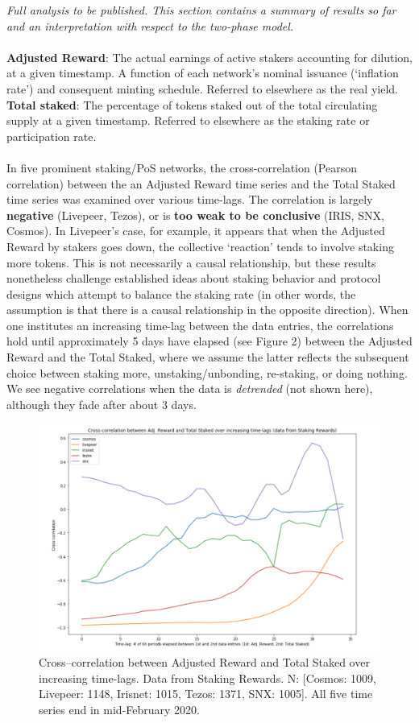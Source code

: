 \documentclass[8pt]{article}
\begin{document}
\textit{Full analysis to be published. This section contains a summary of results so far and an interpretation with respect to the two-phase model.}
\\\\
\textbf{Adjusted Reward}: The actual earnings of active stakers accounting for dilution, at a given timestamp. A function of each network's nominal issuance (`inflation rate') and consequent minting schedule. Referred to elsewhere as the real yield.
\\
\textbf{Total staked}: The percentage of tokens staked out of the total circulating supply at a given timestamp. Referred to elsewhere as the staking rate or participation rate.
\\\\
In five prominent staking/PoS networks, the cross-correlation (Pearson correlation) between the an Adjusted Reward time series and the Total Staked time series was examined over various time-lags. The correlation is largely \textbf{negative} (Livepeer, Tezos), or is \textbf{too weak to be conclusive} (IRIS, SNX, Cosmos). In Livepeer's case, for example, it appears that when the Adjusted Reward by stakers goes down, the collective `reaction' tends to involve staking more tokens. This is not necessarily a causal relationship, but these results nonetheless challenge established ideas about staking behavior and protocol designs which attempt to balance the staking rate (in other words, the assumption is that there is a causal relationship in the opposite direction). When one institutes an increasing time-lag between the data entries, the correlations hold until approximately 5 days have elapsed (see Figure 2) between the Adjusted Reward and the Total Staked, where we assume the latter reflects the subsequent choice between staking more, unstaking/unbonding, re-staking, or doing nothing. We see negative correlations when the data is \textit{detrended} (not shown here), although they fade after about 3 days.

\begin{figure}[h!]
    \includegraphics[width=\textwidth]{lagged_correlation_SR.png}
    \caption{Cross–correlation between Adjusted Reward and Total Staked over increasing time-lags. Data from Staking Rewards. N: [Cosmos: 1009, Livepeer: 1148, Irisnet: 1015, Tezos: 1371, SNX: 1005]. All five time series end in mid-February 2020.}
    \label{fig:tp}
\end{figure}
\end{document}
